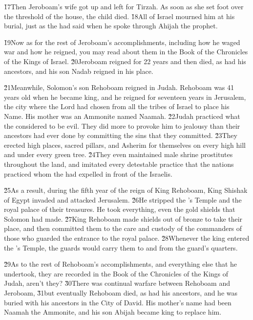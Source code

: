 \begin{poetry}
\end{poetry}

\v{17}Then Jeroboam's wife got up and left for Tirzah. As soon as she set foot over the threshold of the house, the child died. \v{18}All of Israel mourned him at his burial, just as the  had said when he spoke through Ahijah the prophet.

\v{19}Now as for the rest of Jeroboam's accomplishments, including how he waged war and how he reigned, you may read about them in the Book of the Chronicles of the Kings of Israel. \v{20}Jeroboam reigned for 22 years and then died, as had his ancestors, and his son Nadab reigned in his place.

\v{21}Meanwhile, Solomon's son Rehoboam reigned in Judah. Rehoboam was 41 years old when he became king, and he reigned for seventeen years in Jerusalem, the city where the Lord had chosen from all the tribes of Israel to place his Name. His mother was an Ammonite named Naamah. \v{22}Judah practiced what the  considered to be evil. They did more to provoke him to jealousy than their ancestors had ever done by committing the sins that they committed. \v{23}They erected high places, sacred pillars, and Asherim for themselves on every high hill and under every green tree. \v{24}They even maintained male shrine prostitutes throughout the land, and imitated every detestable practice that the nations practiced whom the  had expelled in front of the Israelis.

\v{25}As a result, during the fifth year of the reign of King Rehoboam, King Shishak of Egypt invaded and attacked Jerusalem. \v{26}He stripped the 's Temple and the royal palace of their treasures. He took everything, even the gold shields that Solomon had made. \v{27}King Rehoboam made shields out of bronze to take their place, and then committed them to the care and custody of the commanders of those who guarded the entrance to the royal palace. \v{28}Whenever the king entered the 's Temple, the guards would carry them to and from the guard's quarters.

\v{29}As to the rest of Rehoboam's accomplishments, and everything else that he undertook, they are recorded in the Book of the Chronicles of the Kings of Judah, aren't they? \v{30}There was continual warfare between Rehoboam and Jeroboam, \v{31}but eventually Rehoboam died, as had his ancestors, and he was buried with his ancestors in the City of David. His mother's name had been Naamah the Ammonite, and his son Abijah became king to replace him.

